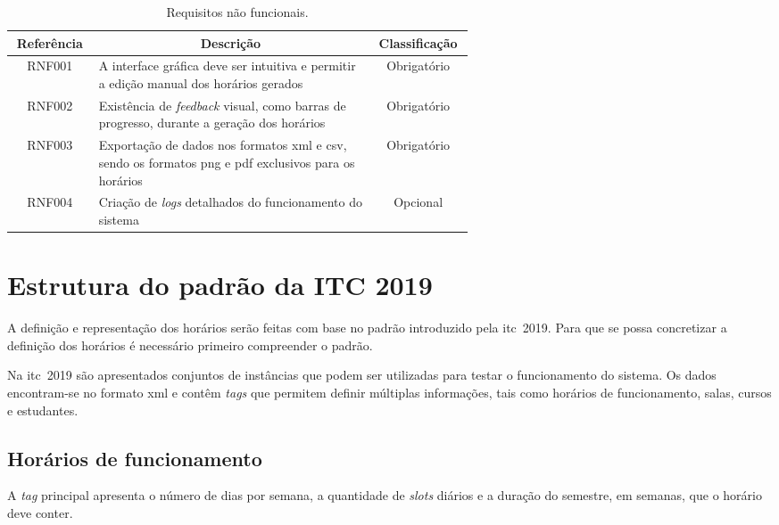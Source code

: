 {
\setlength{\tabcolsep}{.8em}
\begin{table}[htbp]
    \centering
    \caption{Requisitos não funcionais.}
    \label{tabela:requisitos-nao-funcionais}
    \begin{tabular}{c p{0.6\linewidth} c}
        \toprule
        \textbf{Referência} & \multicolumn{1}{c}{\textbf{Descrição}} & \textbf{Classificação} \\ \midrule
        RNF001     & A interface gráfica deve ser intuitiva e permitir a edição manual dos horários gerados   & Obrigatório   \\ \midrule
        RNF002     & Existência de \textit{feedback} visual, como barras de progresso, durante a geração dos horários & Obrigatório   \\ \midrule
        RNF003 &
        Exportação de dados nos formatos \gls{xml} e \gls{csv}, sendo os formatos \gls{png} e \gls{pdf} exclusivos para os horários &
        Obrigatório \\ \midrule
        RNF004     & Criação de \textit{logs} detalhados do funcionamento do sistema                          & Opcional      \\ \bottomrule
    \end{tabular}
\end{table}
}

\section{Estrutura do padrão da ITC 2019}
\label{capitulo3:Padrao-itc2019}

A definição e representação dos horários serão feitas com base no padrão introduzido pela \gls{itc}~2019. Para que se possa concretizar a definição dos horários é necessário primeiro compreender o padrão.

Na \gls{itc}~2019 são apresentados conjuntos de instâncias que podem ser utilizadas para testar o funcionamento do sistema. Os dados encontram-se no formato \gls{xml} e contêm \textit{tags} que permitem definir múltiplas informações, tais como horários de funcionamento, salas, cursos e estudantes.

\subsection{Horários de funcionamento}

A \textit{tag} principal apresenta o número de dias por semana, a quantidade de \textit{slots} diários e a duração do semestre, em semanas, que o horário deve conter.

